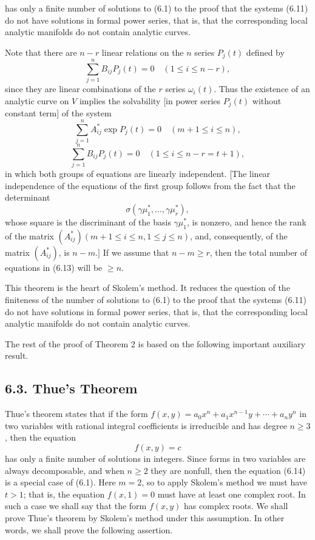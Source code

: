 \documentclass{article}
\begin{document}
has only a finite number of solutions to (6.1) to the proof that the systems 
(6.11) do not have solutions in formal power series, that is, that the corresponding 
local analytic manifolds do not contain analytic curves.

Note that there are $n - r$ linear relations on the $n$ series $P_j(t)$ defined by 
\begin{equation}
\sum_{j=1}^n B_{ij} P_j(t) = 0 \quad (1 \leq i \leq n - r),
\end{equation}
since they are linear combinations of the $r$ series $\omega_i(t)$. Thus the existence of an 
analytic curve on $V$ implies the solvability [in power series $P_j(t)$ without constant term] 
of the system
\begin{equation}
\sum_{j=1}^n A_{ij}^* \exp P_j(t) = 0 \quad (m + 1 \leq i \leq n),
\end{equation}
\begin{equation}
\sum_{j=1}^n B_{ij} P_j(t) = 0 \quad (1 \leq i \leq n - r = t + 1),
\end{equation}
in which both groups of equations are linearly independent. [The linear independence of the 
equations of the first group follows from the fact that the determinant 
\begin{equation}
\sigma(\gamma \mu_1^*, \ldots, \gamma \mu_r^*),
\end{equation}
whose square is the discriminant of the basis $\gamma \mu_1^*$, is nonzero, and hence the rank 
of the matrix $(A_{ij}^*) (m + 1 \leq i \leq n, 1 \leq j \leq n)$, and, consequently, of the 
matrix $(A_{ij}^*)$, is $n - m.]$ If we assume that $n - m \geq r$, then the total number of 
equations in (6.13) will be $\geq n$.

This theorem is the heart of Skolem's method. It reduces the question of the finiteness of the 
number of solutions to (6.1) to the proof that the systems (6.11) do not have solutions in formal 
power series, that is, that the corresponding local analytic manifolds do not contain analytic curves.

The rest of the proof of Theorem 2 is based on the following important auxiliary result.




\subsection*{6.3. Thue's Theorem}
Thue's theorem states that if the form $f(x, y) = a_0 x^n + a_1 x^{n-1} y + \cdots + a_n y^n$ 
in two variables with rational integral coefficients is irreducible and has degree $n \geq 3$, 
then the equation
\begin{equation}
f(x, y) = c
\end{equation}
has only a finite number of solutions in integers. Since forms in two variables are always decomposable, 
and when $n \geq 2$ they are nonfull, then the equation (6.14) is a special case of (6.1). Here $m = 2$, 
so to apply Skolem's method we must have $t > 1$; that is, the equation $f(x, 1) = 0$ must have at least 
one complex root. In such a case we shall say that the form $f(x, y)$ has complex roots. We shall prove 
Thue's theorem by Skolem's method under this assumption. In other words, we shall prove the following assertion.
\end{document}
